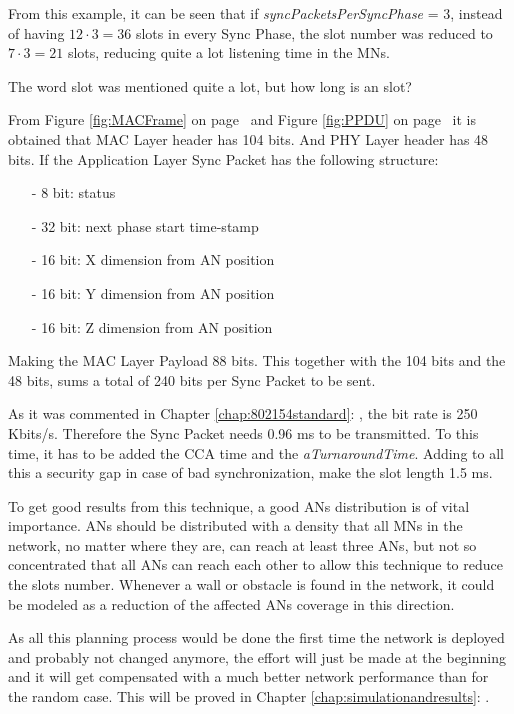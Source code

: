 From this example, it can be seen that if \textit{syncPacketsPerSyncPhase} = 3, instead of having $12 \cdot 3 = 36$ slots in every Sync Phase, the slot 
number was reduced to $7 \cdot 3 = 21$ slots, reducing quite a lot listening time in the \acp{MN}.

The word slot was mentioned quite a lot, but how long is an slot?

From Figure \ref{fig:MACFrame} on page~\pageref{fig:MACFrame} and Figure \ref{fig:PPDU} on page~\pageref{fig:PPDU} it is obtained that \ac{MAC}
Layer header has 104 bits. And \ac{PHY} Layer header has 48 bits. If the Application Layer Sync Packet has the following structure:
\begin{itemize}
 \item[-] 8 bit: status
 \item[-] 32 bit: next phase start time-stamp
 \item[-] 16 bit: X dimension from \ac{AN} position
 \item[-] 16 bit: Y dimension from \ac{AN} position
 \item[-] 16 bit: Z dimension from \ac{AN} position
\end{itemize}
Making the \ac{MAC} Layer Payload 88 bits. This together with the 104 bits and the 48 bits, sums a total of 240 bits per Sync Packet to be sent.

As it was commented in Chapter \ref{chap:802154standard}: , the bit rate is 250 Kbits/s. Therefore the Sync
Packet needs 0.96 ms to be transmitted. To this time, it has to be added the \ac{CCA} time and the \textit{aTurnaroundTime}. Adding to all this
a security gap in case of bad synchronization, make the slot length 1.5 ms.

To get good results from this technique, a good \acp{AN} distribution is of vital importance. \acp{AN} should be distributed with a density that all
\acp{MN} in the network, no matter where they are, can reach at least three \acp{AN}, but not so concentrated that all \acp{AN} can
reach each other to allow this technique to reduce the slots number. Whenever a wall or obstacle is found in the network, it could be modeled as
a reduction of the affected \acp{AN} coverage in this direction. 

As all this planning process would be done the first time the network is deployed and probably not changed anymore, the effort will just be made 
at the beginning and it will get compensated with a much better network performance than for the random case. This will be proved in Chapter 
\ref{chap:simulationandresults}: .